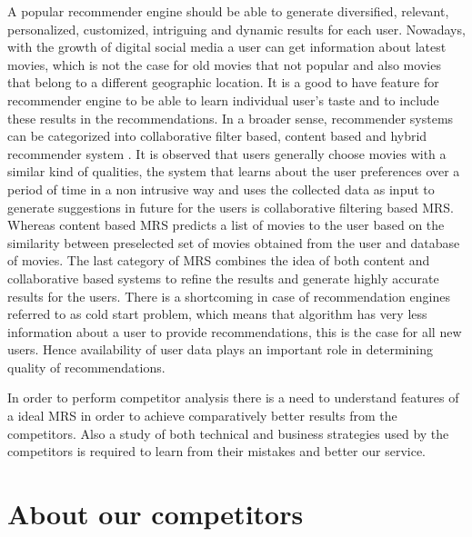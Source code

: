 A popular recommender engine should be able to generate diversified, relevant, personalized, customized, intriguing and dynamic results for each user. Nowadays, with the growth of digital social media a user can get information about latest movies, which is not the case for old movies that not popular and also movies that belong to a different geographic location. It is a good to have feature for recommender engine to be able to learn individual user's taste and to include these results in the recommendations. In a broader sense, recommender systems can be categorized into collaborative filter based, content based and hybrid recommender system \citep{Article_1}. It is observed that users generally choose movies with a similar kind of qualities, the system that learns about the user preferences over a period of time in a non intrusive way and uses the collected data as input to generate suggestions in future for the users is collaborative filtering based \acrshort{MRS}. Whereas content based \acrshort{MRS} predicts a list of movies to the user based on the similarity between preselected set of movies obtained from the user and database of movies. The last category of \acrshort{MRS} combines the idea of both content and collaborative based systems to refine the results and generate highly accurate results for the users. There is a shortcoming in case of recommendation engines referred to as cold start problem, which means that algorithm has very less information about a user to provide recommendations, this is the case for all new users. Hence availability of user data plays an important role in determining quality of recommendations.

In order to perform competitor analysis there is a need to understand features of a ideal \acrshort{MRS} in order to achieve comparatively better results from the competitors. Also a study of both technical and business strategies used by the competitors is required to learn from their mistakes and better our service.           

\section{About our competitors}

